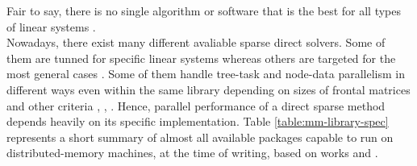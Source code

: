\label{subseq:mm-library-choice}

Fair to say, there is no single algorithm or software that is the best for all types of linear systems \cite{list-of-sparse-direct-solvers}.\\


Nowadays, there exist many different avaliable sparse direct solvers. Some of them are tunned for specific linear systems whereas others are targeted for the most general cases \cite{list-of-sparse-direct-solvers}. Some of them handle tree-task and node-data parallelism in different ways even within the same library depending on sizes of frontal matrices and other criteria \cite{wsmp}, \cite{mumps-manual}, \cite{superlu-manual}. Hence, parallel performance of a direct sparse method depends heavily on its specific implementation. Table \ref{table:mm-library-spec} represents a short summary of almost all available packages capable to run on distributed-memory machines, at the time of writing, based on works \cite{list-of-sparse-direct-solvers} and \cite{petsc-web-page}.\\


